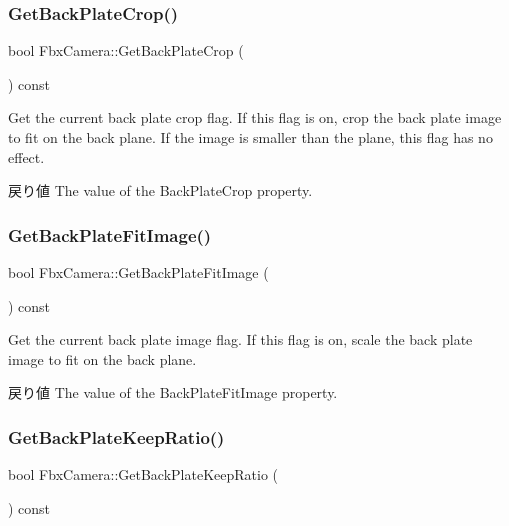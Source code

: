 \subsubsection{\texorpdfstring{Get\+Back\+Plate\+Crop()}{GetBackPlateCrop()}}
{\footnotesize\ttfamily bool Fbx\+Camera\+::\+Get\+Back\+Plate\+Crop (\begin{DoxyParamCaption}{ }\end{DoxyParamCaption}) const}

Get the current back plate crop flag. If this flag is on, crop the back plate image to fit on the back plane. If the image is smaller than the plane, this flag has no effect. \begin{DoxyReturn}{戻り値}
The value of the Back\+Plate\+Crop property. 
\end{DoxyReturn}
\mbox{\label{class_fbx_camera_a5174e9fbec62fa007eb86d3e5c7ef70f}} 
\subsubsection{\texorpdfstring{Get\+Back\+Plate\+Fit\+Image()}{GetBackPlateFitImage()}}
{\footnotesize\ttfamily bool Fbx\+Camera\+::\+Get\+Back\+Plate\+Fit\+Image (\begin{DoxyParamCaption}{ }\end{DoxyParamCaption}) const}

Get the current back plate image flag. If this flag is on, scale the back plate image to fit on the back plane. \begin{DoxyReturn}{戻り値}
The value of the Back\+Plate\+Fit\+Image property. 
\end{DoxyReturn}
\mbox{\label{class_fbx_camera_a44d26a393e58fec107643992dd3bb439}} 
\subsubsection{\texorpdfstring{Get\+Back\+Plate\+Keep\+Ratio()}{GetBackPlateKeepRatio()}}
{\footnotesize\ttfamily bool Fbx\+Camera\+::\+Get\+Back\+Plate\+Keep\+Ratio (\begin{DoxyParamCaption}{ }\end{DoxyParamCaption}) const}

